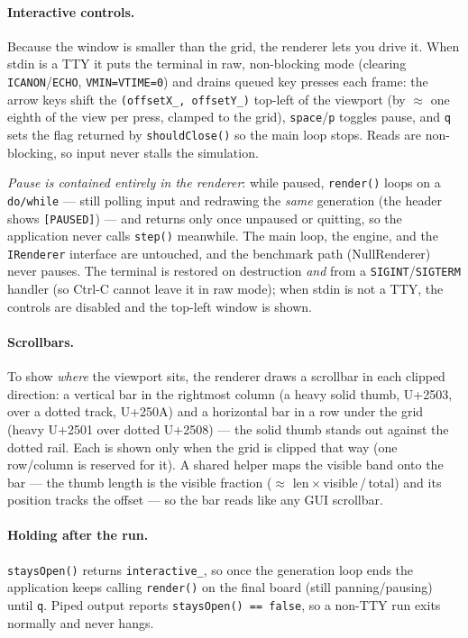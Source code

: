 \documentclass[
	english,
	letterpaper, oneside
]{article}
\begin{document}
\paragraph{Interactive controls.} Because the window is smaller than the grid,
the renderer lets you drive it. When stdin is a TTY it puts the terminal in raw,
non-blocking mode (clearing \texttt{ICANON}/\texttt{ECHO}, \texttt{VMIN=VTIME=0})
and drains queued key presses each frame: the arrow keys shift the
\texttt{(offsetX\_, offsetY\_)} top-left of the viewport (by $\approx$ one eighth
of the view per press, clamped to the grid), \texttt{space}/\texttt{p} toggles
pause, and \texttt{q} sets the flag returned by \texttt{shouldClose()} so the main
loop stops. Reads are non-blocking, so input never stalls the simulation.

\emph{Pause is contained entirely in the renderer}: while paused,
\texttt{render()} loops on a \texttt{do/while} --- still polling input and
redrawing the \emph{same} generation (the header shows \texttt{[PAUSED]}) --- and
returns only once unpaused or quitting, so the application never calls
\texttt{step()} meanwhile. The main loop, the engine, and the \texttt{IRenderer}
interface are untouched, and the benchmark path (NullRenderer) never pauses. The
terminal is restored on destruction \emph{and} from a
\texttt{SIGINT}/\texttt{SIGTERM} handler (so Ctrl-C cannot leave it in raw mode);
when stdin is not a TTY, the controls are disabled and the top-left window is
shown.

\paragraph{Scrollbars.} To show \emph{where} the viewport sits, the renderer
draws a scrollbar in each clipped direction: a vertical bar in the rightmost
column (a heavy solid thumb, U+2503, over a dotted track, U+250A) and a
horizontal bar in a row under the grid (heavy U+2501 over dotted U+2508) --- the
solid thumb stands out against the dotted rail. Each is shown only when the grid
is clipped that way (one row/column is reserved for it). A shared helper
maps the visible band onto the bar --- the thumb length is the visible fraction
($\approx$ len\,$\times$\,visible\,/\,total) and its position tracks the offset
--- so the bar reads like any GUI scrollbar.

\paragraph{Holding after the run.} \texttt{staysOpen()} returns
\texttt{interactive\_}, so once the generation loop ends the application keeps
calling \texttt{render()} on the final board (still panning/pausing) until
\texttt{q}. Piped output reports \texttt{staysOpen() == false}, so a non-TTY run
exits normally and never hangs.
\end{document}

